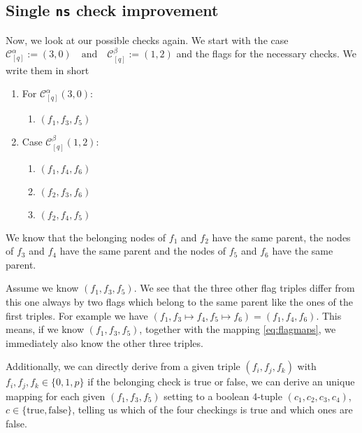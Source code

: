\documentclass{article}
\newtheorem*{theorem A}{Theorem A}
\newtheorem*{theorem B}{N\"olker's Theorem}
\theoremstyle{remark}
\theoremstyle{remark}
\begin{document}
\subsection{Single \texttt{ns} check improvement}
\label{ss:singlenscheckimprovement}
Now, we look at our possible checks again. We start with the case $\mathcal{C}^{\alpha}_{[q]} := \left(3,0\right) \quad \mathrm{and} \quad \mathcal{C}^{\beta}_{[q]} := \left(1,2\right)$ and the flags for the necessary checks. We write them in short

\begin{enumerate}
    \item For $\mathcal{C}^{\alpha}_{[q]}\left(3,0\right)$:
        \begin{enumerate}
            \item $\left(f_{1}, f_{3}, f_{5}\right)$
        \end{enumerate}


  \item Case $\mathcal{C}^{\beta}_{[q]}\left(1,2\right)$:
        \begin{enumerate}
            \item $\left(f_{1}, f_{4}, f_{6}\right)$
            \item $\left(f_{2}, f_{3}, f_{6}\right)$
            \item $\left(f_{2}, f_{4}, f_{5}\right)$
        \end{enumerate}
\end{enumerate}

We know that the belonging nodes of $f_{1}$ and $f_{2}$ have the same parent, the nodes of $f_{3}$ and $f_{4}$ have the same parent and the nodes of $f_{5}$ and $f_{6}$ have the same parent. 

Assume we know $\left(f_{1}, f_{3}, f_{5}\right)$. We see that the three other flag triples differ from this one always by two flags which belong to the same parent like the ones of the first triples. For example we have $\left(f_{1}, f_{3} \mapsto f_{4}, f_{5} \mapsto f_{6}\right) = \left(f_{1}, f_{4}, f_{6}\right)$. This means, if we know $\left(f_{1}, f_{3}, f_{5}\right)$, together with the mapping \ref{eq:flagmaps}, we immediately also know the other three triples.

Additionally, we can directly derive from a given triple $\left(f_{i}, f_{j}, f_{k}\right)$ with $f_{i}, f_{j}, f_{k} \in \{0, 1, p\}$ if the belonging check is true or false, we can derive an unique mapping for each given $\left(f_{1}, f_{3}, f_{5}\right)$ setting to a boolean 4-tuple $\left(c_{1}, c_{2}, c_{3}, c_{4}\right)$, $c \in \{ \mathrm{true}, \mathrm{false} \}$, telling us which of the four checkings is true and which ones are false.
\end{document}
